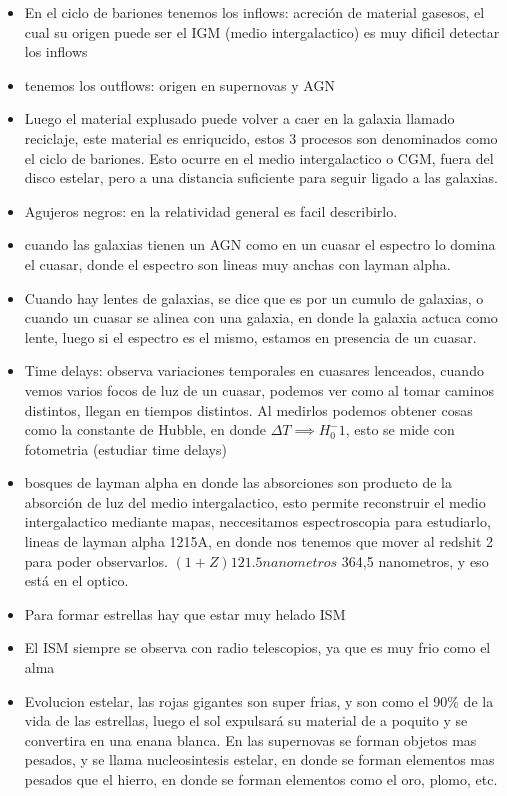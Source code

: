 \documentclass[
  11pt,
  letterpaper,
  answers
]{exam}
\begin{document}
\begin{itemize}
    \item En el ciclo de bariones tenemos los inflows: acreción de material gasesos, el cual su origen puede ser el IGM (medio intergalactico) es muy dificil detectar los inflows
    \item tenemos los outflows: origen en supernovas y AGN 
    \item Luego el material explusado puede volver a caer en la galaxia llamado reciclaje, este material es enriqucido, estos 3 procesos son denominados como el ciclo de bariones. Esto ocurre en el medio intergalactico o CGM, fuera del disco estelar, pero a una distancia suficiente para seguir ligado a las galaxias.
    \item Agujeros negros: en la relatividad general es facil describirlo.
    \item cuando las galaxias tienen un AGN como en un cuasar el espectro lo domina el cuasar, donde el espectro son lineas muy anchas con layman alpha.
    \item Cuando hay lentes de galaxias, se dice que es por un cumulo de galaxias, o cuando un cuasar se alinea con una galaxia, en donde la galaxia actuca como lente, luego si el espectro es el mismo, estamos en presencia de un cuasar.
    \item Time delays: observa variaciones temporales en cuasares lenceados, cuando vemos varios focos de luz de un cuasar, podemos ver como al tomar caminos distintos, llegan en tiempos distintos. Al medirlos podemos obtener cosas como la constante de Hubble, en donde $\Delta T \implies H_{0}^-1$, esto se mide con fotometria (estudiar time delays)
    \item bosques de layman alpha en donde las absorciones son producto de la absorción de luz del medio intergalactico, esto permite reconstruir el medio intergalactico mediante mapas, neccesitamos espectroscopia para estudiarlo, lineas de layman alpha 1215A, en donde nos tenemos que mover al redshit 2 para poder observarlos. $(1+Z)121.5nanometros$ 364,5 nanometros, y eso está en el optico.
    \item Para formar estrellas hay que estar muy helado ISM
    \item El ISM siempre se observa con radio telescopios, ya que es muy frio como el alma
    \item Evolucion estelar, las rojas gigantes son super frias, y son como el 90\% de la vida de las estrellas, luego el sol expulsará su material de a poquito y se convertira en una enana blanca. En las supernovas se forman objetos mas pesados, y se llama nucleosintesis estelar, en donde se forman elementos mas pesados que el hierro, en donde se forman elementos como el oro, plomo, etc.

\end{itemize}
\end{document}
